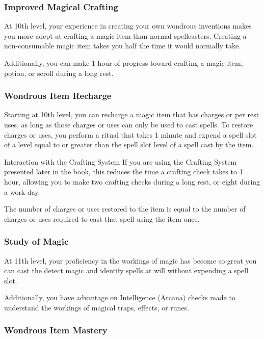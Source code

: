\documentclass[11pt,twoside,openany]{book}  %
\begin{document}
\subsubsection{Improved Magical Crafting}

At 10th level, your experience in creating your own wondrous inventions makes you more adept at crafting a magic item than normal spellcasters. Creating a non-consumable magic item takes you half the time it would normally take.

Additionally, you can make 1 hour of progress toward crafting a magic item, potion, or scroll during a long rest.

\subsubsection{Wondrous Item Recharge}

Starting at 10th level, you can recharge a magic item that has charges or per rest uses, as long as those charges or uses can only be used to cast spells. To restore charges or uses, you perform a ritual that takes 1 minute and expend a spell slot of a level equal to or greater than the spell slot level of a spell cast by the item.

\begin{CalloutBox}{Interaction with the Crafting System}
If you are using the Crafting System presented later in the book, this reduces the time a crafting check takes to 1 hour, allowing you to make two crafting checks during a long rest, or eight during a work day.
\end{CalloutBox}

The number of charges or uses restored to the item is equal to the number of charges or uses required to cast that spell using the item once.

\subsubsection{Study of Magic}

At 11th level, your proficiency in the workings of magic has become so great you can cast the detect magic and identify spells at will without expending a spell slot.

Additionally, you have advantage on Intelligence (Arcana) checks made to understand the workings of magical traps, effects, or runes.

\subsubsection{Wondrous Item Mastery}
\end{document}
